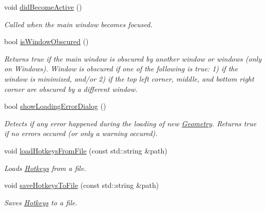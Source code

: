 \begin{DoxyCompactItemize}
\mbox{\label{classpepr3d_1_1_main_application_a2692d734374d2a74c63b45f0856baf1a}} 
void \mbox{\hyperlink{classpepr3d_1_1_main_application_a2692d734374d2a74c63b45f0856baf1a}{did\+Become\+Active}} ()
\begin{DoxyCompactList}\small\item\em Called when the main window becomes focused. \end{DoxyCompactList}\item 
\mbox{\label{classpepr3d_1_1_main_application_a5a9f2357108cc7c32b640559723f5270}} 
bool \mbox{\hyperlink{classpepr3d_1_1_main_application_a5a9f2357108cc7c32b640559723f5270}{is\+Window\+Obscured}} ()
\begin{DoxyCompactList}\small\item\em Returns true if the main window is obscured by another window or windows (only on Windows). Window is obscured if one of the following is true\+: 1) if the window is minimized, and/or 2) if the top left corner, middle, and bottom right corner are obscured by a different window. \end{DoxyCompactList}\item 
\mbox{\label{classpepr3d_1_1_main_application_a8c723a7f716f24de66df40affcd63add}} 
bool \mbox{\hyperlink{classpepr3d_1_1_main_application_a8c723a7f716f24de66df40affcd63add}{show\+Loading\+Error\+Dialog}} ()
\begin{DoxyCompactList}\small\item\em Detects if any error happened during the loading of new \mbox{\hyperlink{classpepr3d_1_1_geometry}{Geometry}}. Returns true if no errors occured (or only a warning occured). \end{DoxyCompactList}\item 
\mbox{\label{classpepr3d_1_1_main_application_a8792c0f1e1c151da1d7fa2b1ff05643d}} 
void \mbox{\hyperlink{classpepr3d_1_1_main_application_a8792c0f1e1c151da1d7fa2b1ff05643d}{load\+Hotkeys\+From\+File}} (const std\+::string \&path)
\begin{DoxyCompactList}\small\item\em Loads \mbox{\hyperlink{classpepr3d_1_1_hotkeys}{Hotkeys}} from a file. \end{DoxyCompactList}\item 
\mbox{\label{classpepr3d_1_1_main_application_ab0fb0391cc13ce9fab835893246a945b}} 
void \mbox{\hyperlink{classpepr3d_1_1_main_application_ab0fb0391cc13ce9fab835893246a945b}{save\+Hotkeys\+To\+File}} (const std\+::string \&path)
\begin{DoxyCompactList}\small\item\em Saves \mbox{\hyperlink{classpepr3d_1_1_hotkeys}{Hotkeys}} to a file. \end{DoxyCompactList}\end{DoxyCompactItemize}
